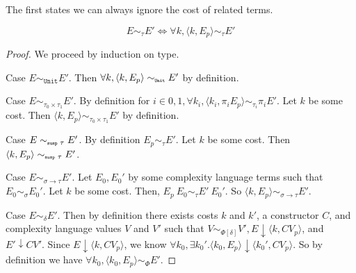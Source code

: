 The first states we can always ignore the cost of related terms.
\begin{lemma}
  \label{lem:ignorecost}
\[
  E \sim_\tau E' \Leftrightarrow \forall k, \langle k, E_p \rangle \sim_\tau E'
\]
\end{lemma}
\begin{proof}
  We proceed by induction on type.

  Case $E \sim_{\texttt{Unit}} E'$. 
  Then $\forall k, \langle k, E_p \rangle \sim_{\texttt{\tiny{Unit}}} E'$ by definition.

  Case $E \sim_{\tau_0 \times \tau_1} E'$.
  By definition for $i\in{0,1}, \forall k_i, \langle k_i, \pi_i E_p \rangle \sim_{\tau_i} \pi_i E'$.
  Let $k$ be some cost.
  Then $\langle k, E_p \rangle \sim_{\tau_0 \times \tau_1} E'$ by definition.

  Case $E \sim_{\texttt{\tiny{susp }} \tau} E'$.
  By definition $E_p \sim_\tau E'$.
  Let $k$ be some cost.
  Then $\langle k, E_p \rangle \sim_{\texttt{\tiny{susp }} \tau} E'$.

  Case $E \sim_{\sigma \to \tau} E'$.
  Let $E_0, E_0'$ by some complexity language terms such that $E_0 \sim_\sigma E_0'$.
  Let $k$ be some cost.
  Then, $E_p\ E_0 \sim_\tau E'\ E_0'$.
  So $\langle k, E_p \rangle \sim_{\sigma \to \tau} E'$.

  Case $E \sim_\delta E'$.
  Then by definition there exists costs $k$ and $k'$, a constructor $C$, and complexity language values $V$ and $V'$ such that $V \sim_{\Phi[\delta]} V', E \downarrow \langle k, C V_p \rangle$, and $E' \downarrow C V'$.
  Since $E \downarrow \langle k, C V_p \rangle$, we know $\forall k_0, \exists k_0'. \langle k_0, E_p \rangle \downarrow \langle k_0', C V_p \rangle$.
  So by definition we have $\forall k_0, \langle k_0, E_p \rangle \sim_\Phi E'$.
\end{proof}

